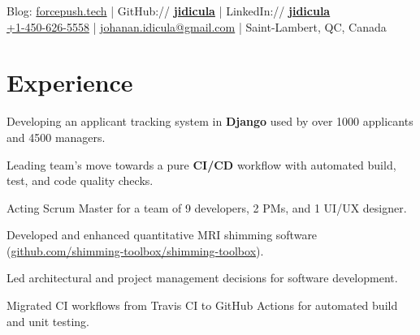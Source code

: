 \documentclass[]{jidicula-resume}
\begin{document}
\lastupdated{}


{ Blog: \href{http://bit.ly/jidicula-site}{forcepush.tech}
  | GitHub:// \href{http://bit.ly/jidicula_github}{\bf jidicula} | LinkedIn:// \href{https://bit.ly/jidicula-linkedin}{\bf jidicula} \\
  \href{tel:14506265558}{+1-450-626-5558}
  | \href{mailto:johanan.idicula+resume@gmail.com}{johanan.idicula@gmail.com}
  | Saint-Lambert, QC, Canada}

\section{Experience}

\vspace{\topsep} %
\begin{tightemize}
\item Developing an applicant tracking system in \textbf{Django} used by over 1000 applicants and 4500 managers.
\item Leading team's move towards a pure \textbf{CI/CD} workflow with automated build, test, and code quality checks.
\item Acting Scrum Master for a team of 9 developers, 2 PMs, and 1 UI/UX designer.
\end{tightemize}
\sectionsep{}

\vspace{\topsep} %
\begin{tightemize}
\item Developed and enhanced quantitative MRI shimming software (\href{http://bit.ly/jidicula-shimming-toolbox}{github.com/shimming-toolbox/shimming-toolbox}).
\item Led architectural and project management decisions for software development.
\item Migrated CI workflows from Travis CI to GitHub Actions for automated build and unit testing.
\end{tightemize}
\sectionsep{}
\end{document}
